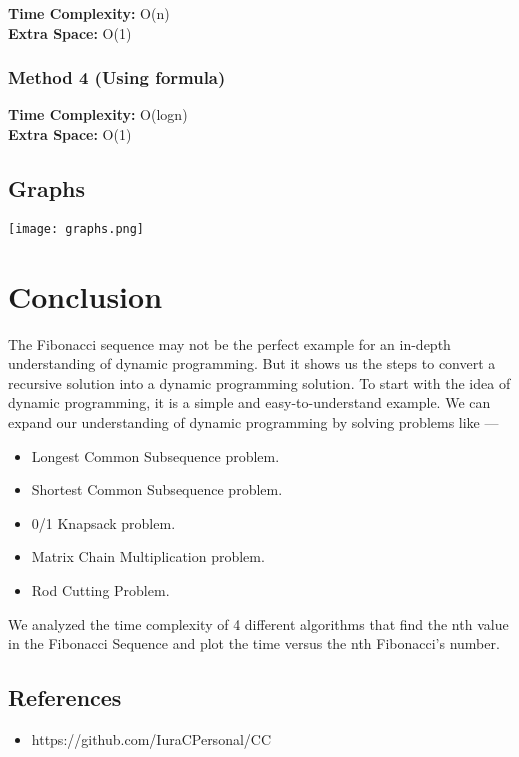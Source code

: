 \documentclass[a4paper, 12pt]{article}
\begin{document}
\textbf{Time Complexity:} O(n) \\
\textbf{Extra Space:} O(1)

\subsubsection*{Method 4 (Using formula) }

\textbf{Time Complexity:} O(logn) \\
\textbf{Extra Space:} O(1)

\subsection{Graphs}

\texttt{[image: graphs.png]}

\newpage

\section{Conclusion}

The Fibonacci sequence may not be the perfect example 
for an in-depth understanding of dynamic programming. 
But it shows us the steps to convert a recursive solution 
into a dynamic programming solution. To start with the idea 
of dynamic programming, it is a simple and easy-to-understand 
example. We can expand our understanding of dynamic programming 
by solving problems like —
\begin{itemize}
  \item Longest Common Subsequence problem.
  \item Shortest Common Subsequence problem.
  \item 0/1 Knapsack problem.
  \item Matrix Chain Multiplication problem.
  \item Rod Cutting Problem.
\end{itemize}

We analyzed the time complexity of 4 different 
algorithms that find the nth value in the Fibonacci Sequence and plot 
the time versus the nth Fibonacci's number.

\subsection{References}

\begin{itemize}
  \item https://github.com/IuraCPersonal/CC
\end{itemize}
\end{document}
